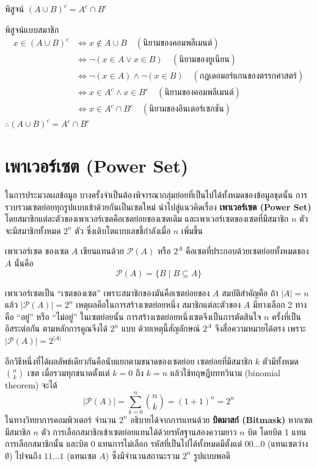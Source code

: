 \begin{ex}
\label{ex:proof-demorgan-set}
พิสูจน์ $(A \cup B)^c = A^c \cap B^c$
\end{ex}
\begin{solution}
พิสูจน์แบบสมาชิก
\begin{align*}
x \in (A \cup B)^c
&\Leftrightarrow x \notin A \cup B \quad (\text{นิยามของคอมพลีเมนต์})\\
&\Leftrightarrow \neg(x \in A \lor x \in B) \quad (\text{นิยามของยูเนียน})\\
&\Leftrightarrow \neg(x \in A) \land \neg(x \in B) \quad (\text{กฎเดอมอร์แกนของตรรกศาสตร์})\\
&\Leftrightarrow x \in A^c \land x \in B^c \quad (\text{นิยามของคอมพลีเมนต์})\\
&\Leftrightarrow x \in A^c \cap B^c \quad (\text{นิยามของอินเตอร์เซกชัน})
\end{align*}
$\therefore (A \cup B)^c = A^c \cap B^c$ \solhere
\end{solution}

\section{เพาเวอร์เซต (Power Set)}
\label{sec:power-set}
ในการประมวลผลข้อมูล บางครั้งจำเป็นต้องพิจารณากลุ่มย่อยที่เป็นไปได้ทั้งหมดของข้อมูลชุดนั้น การรวบรวมเซตย่อยทุกรูปแบบเข้าด้วยกันเป็นเซตใหม่ นำไปสู่แนวคิดเรื่อง \textbf{เพาเวอร์เซต (Power Set)} โดยสมาชิกแต่ละตัวของเพาเวอร์เซตคือเซตย่อยของเซตเดิม และเพาเวอร์เซตของเซตที่มีสมาชิก $n$ ตัวจะมีสมาชิกทั้งหมด $2^n$ ตัว ซึ่งเติบโตแบบเลขชี้กำลังเมื่อ $n$ เพิ่มขึ้น~\parencite{enderton1977settheory}

\begin{definition}
เพาเวอร์เซต ของเซต $A$ เขียนแทนด้วย $\mathcal{P}(A)$ หรือ $2^A$ คือเซตที่ประกอบด้วยเซตย่อยทั้งหมดของ $A$ นั่นคือ
\[ \mathcal{P}(A) = \{B \mid B \subseteq A\} \]
\label{def:power-set}
\end{definition}

เพาเวอร์เซตเป็น ``เซตของเซต'' เพราะสมาชิกของมันคือเซตย่อยของ $A$ สมบัติสำคัญคือ ถ้า $|A| = n$ แล้ว $|\mathcal{P}(A)| = 2^n$ เหตุผลคือในการสร้างเซตย่อยหนึ่ง สมาชิกแต่ละตัวของ $A$ มีทางเลือก 2 ทาง คือ ``อยู่'' หรือ ``ไม่อยู่'' ในเซตย่อยนั้น การสร้างเซตย่อยหนึ่งเซตจึงเป็นการตัดสินใจ $n$ ครั้งที่เป็นอิสระต่อกัน ตามหลักการคูณจึงได้ $2^n$ แบบ ด้วยเหตุนี้สัญลักษณ์ $2^A$ จึงสื่อความหมายได้ตรง เพราะ $|\mathcal{P}(A)| = 2^{|A|}$

อีกวิธีหนึ่งที่ได้ผลลัพธ์เดียวกันคือนับแยกตามขนาดของเซตย่อย เซตย่อยที่มีสมาชิก $k$ ตัวมีทั้งหมด $\binom{n}{k}$ เซต เมื่อรวมทุกขนาดตั้งแต่ $k = 0$ ถึง $k = n$ แล้วใช้ทฤษฎีบททวินาม (binomial theorem) จะได้
\[
|\mathcal{P}(A)| = \sum_{k=0}^{n} \binom{n}{k} = (1 + 1)^n = 2^n
\]
ในทางวิทยาการคอมพิวเตอร์ จำนวน $2^n$ อธิบายได้จากการแทนด้วย \textbf{บิตมาสก์ (Bitmask)} หากเซตมีสมาชิก $n$ ตัว การเลือกสมาชิกเข้าเซตย่อยแทนได้ด้วยรหัสฐานสองความยาว $n$ บิต โดยบิต 1 แทนการเลือกสมาชิกนั้น และบิต 0 แทนการไม่เลือก รหัสที่เป็นไปได้ทั้งหมดมีตั้งแต่ $00\ldots 0$ (แทนเซตว่าง $\emptyset$) ไปจนถึง $11\ldots 1$ (แทนเซต $A$) ซึ่งมีจำนวนสถานะรวม $2^n$ รูปแบบพอดี

